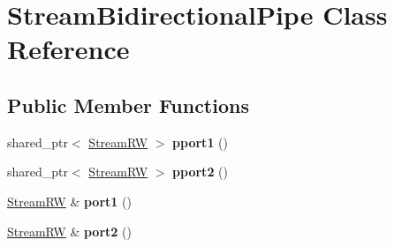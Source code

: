 \hypertarget{classStreamBidirectionalPipe}{\section{Stream\+Bidirectional\+Pipe Class Reference}
\label{classStreamBidirectionalPipe}
}
\subsection*{Public Member Functions}
\begin{DoxyCompactItemize}
\item 
\hypertarget{classStreamBidirectionalPipe_a21fc409f96e1ab433ce06a409c1dd2a2}{shared\+\_\+ptr$<$ \hyperlink{structStreamRW}{Stream\+R\+W} $>$ {\bfseries pport1} ()}\label{classStreamBidirectionalPipe_a21fc409f96e1ab433ce06a409c1dd2a2}

\item 
\hypertarget{classStreamBidirectionalPipe_af2f12439f55a9e8c15a2ed8c347009ac}{shared\+\_\+ptr$<$ \hyperlink{structStreamRW}{Stream\+R\+W} $>$ {\bfseries pport2} ()}\label{classStreamBidirectionalPipe_af2f12439f55a9e8c15a2ed8c347009ac}

\item 
\hypertarget{classStreamBidirectionalPipe_a8a8bf32af76926f731a02c6f63cb6357}{\hyperlink{structStreamRW}{Stream\+R\+W} \& {\bfseries port1} ()}\label{classStreamBidirectionalPipe_a8a8bf32af76926f731a02c6f63cb6357}

\item 
\hypertarget{classStreamBidirectionalPipe_ad3f082535f4f935a136207f8b070965a}{\hyperlink{structStreamRW}{Stream\+R\+W} \& {\bfseries port2} ()}\label{classStreamBidirectionalPipe_ad3f082535f4f935a136207f8b070965a}

\end{DoxyCompactItemize}
